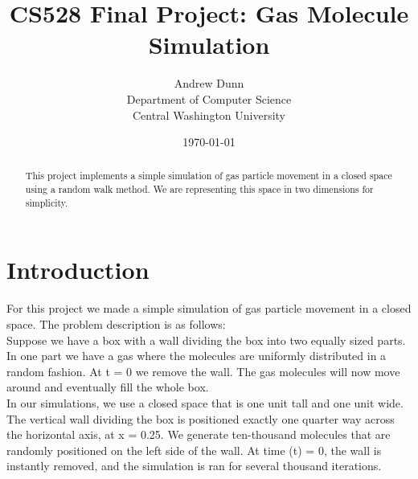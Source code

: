 \documentclass[12pt,a4paper]{article}
\title{\huge{\textbf{CS528 Final Project: Gas Molecule Simulation}}}
\author{
	Andrew Dunn\\
	Department of Computer Science\\
	Central Washington University}
\date{\today}
\begin{document}
	
	\maketitle
	\thispagestyle{empty}
	
	\clearpage %
	
	\begin{abstract}
		This project implements a simple simulation of gas particle movement in a closed space using a random walk method. We are representing this space in two dimensions for simplicity.
	\end{abstract}
	\thispagestyle{empty}
	
	\clearpage %
	
	\section{Introduction} %

	For this project we made a simple simulation of gas particle movement in a closed space. The problem description is as follows:\\
	
	Suppose we have a box with a wall dividing the box into two equally
	sized parts. In one part we have a gas where the molecules are uniformly
	distributed in a random fashion. At t = 0 we remove the wall. The gas
	molecules will now move around and eventually fill the whole box.\cite{Langtangen:2014:PSP:2676454}\\
	
	In our simulations, we use a closed space that is one unit tall and one unit wide. The vertical wall dividing the box is positioned exactly one quarter way across the horizontal axis, at x = 0.25. We generate ten-thousand molecules that are randomly positioned on the left side of the wall. At time (t) = 0, the wall is instantly removed, and the simulation is ran for several thousand iterations.\\
	
\end{document}
